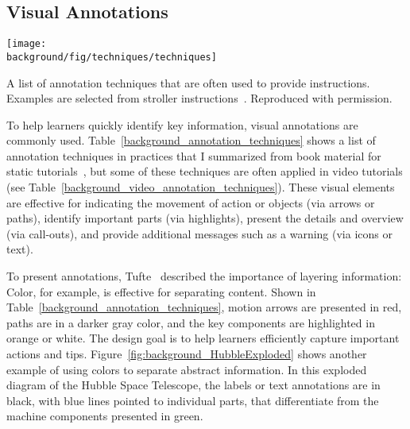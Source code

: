 
\subsection{Visual Annotations}

\begin{table*}[!htbp]
  \centering
  \texttt{[image: \\background/fig/techniques/techniques]}
  \caption{A list of annotation techniques that are often used to provide instructions. Examples are selected from stroller instructions~\cite{MountainBuggyInstructions}. Reproduced with permission.}
  \label{background_annotation_techniques}
\end{table*}

To help learners quickly identify key information, visual annotations are commonly used. Table~\ref{background_annotation_techniques} shows a list of annotation techniques in practices that I summarized from book material for static tutorials~\cite{mijksenaar1999open,greenberg2012sketching,Buxton:2007:SUE:1526229,tufte1990envisioning}, but some of these techniques are often applied in video tutorials (see Table~\ref{background_video_annotation_techniques}).
%
These visual elements are effective for indicating the movement of action or objects (via arrows or paths), identify important parts (via highlights), present the details and overview (via call-outs), and provide additional messages such as a warning (via icons or text).

To present annotations, Tufte~\cite{tufte1990envisioning} described the importance of layering information: 
%
Color, for example, is effective for separating content. Shown in Table~\ref{background_annotation_techniques}, motion arrows are presented in red, paths are in a darker gray color, and the key components are highlighted in orange or white. The design goal is to help learners efficiently capture important actions and tips.
%
Figure~\ref{fig:background_HubbleExploded} shows another example of using colors to separate abstract information. In this exploded diagram of the Hubble Space Telescope, the labels or text annotations are in black, with blue lines pointed to individual parts, that differentiate from the machine components presented in green.

